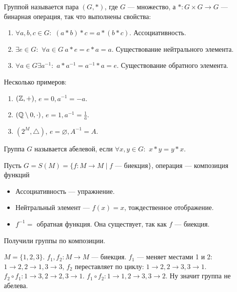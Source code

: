  \begin{definition}
     Группой называется пара $(G, \ast)$, где  $G$ --- множество, а  $\ast: G \times G \to G$ --- бинарная операция, так что выполнены свойства:
     \begin{enumerate}
         \item $\forall a,b,c \in G:$  $(a \ast b) \ast c = a \ast (b \ast c)$. Ассоциативность.
         \item $\exists e \in G:$ $\forall a \in G\  a \ast e = e \ast a = a$. Существование нейтрального элемента.
         \item $\forall a \in G \exists a^{-1}:$  $a \ast a^{-1} = a^{-1} \ast a = e$. Существование обратного элемента.
     \end{enumerate}
 \end{definition}
\slashn
Несколько примеров:
\begin{enumerate}
    \item $(\mathbb{Z}, +)$,  $e=0, a^{-1}=-a$.
    \item  $(\mathbb{Q} \setminus 0, \cdot)$,  $e=1, a^{-1}= \frac{1}{a}$.
    \item $(2^M, \bigtriangleup)$, $e=\varnothing, A^{-1} = A$.
\end{enumerate}
\begin{definition}
    Группа $G$ называется абелевой, если  $\forall x, y \in G:$ $x \ast y = y \ast x$.
\end{definition}
\begin{example}
    Пусть $G=S(M) = \{f: M \to M \mid f\text{ --- биекция}\}$, операция --- композиция функций
    \begin{itemize}
    \item Ассоциативность --- упражнение.
    \item Нейтральный элемент --- $f(x) = x$, тождественное отображение.
    \item  $f^{-1}=$ обратная функция. Она существует, так как $f$ --- биекция. 
    \end{itemize}
    \slashn
    Получили группы по композиции.
\end{example}
\begin{example}
    $M=\{1,2,3\}$.  $f_1, f_2: M \to M$ --- биекция.  $f_1$ --- меняет местами  1 и 2: $1 \to 2, 2 \to 1, 3 \to 3$,  $f_2$ переставляет по циклу: $1 \to 2, 2 \to 3, 3 \to 1$. $f_2 \circ f_1: 1 \to 3, 2\to 2, 3\to 1$. $f_1 \circ f_2: 1 \to 1, 2 \to 3, 3 \to 2$. Ну значит группа не абелева.
\end{example}
